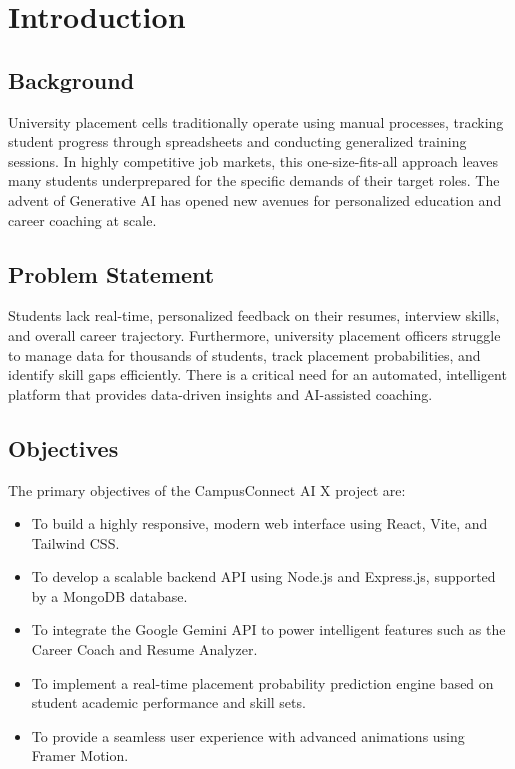 \documentclass[12pt,a4paper]{report}
\begin{document}
\tableofcontents
\newpage

\setcounter{page}{1} %

\chapter{Introduction}
\section{Background}
University placement cells traditionally operate using manual processes, tracking student progress through spreadsheets and conducting generalized training sessions. In highly competitive job markets, this one-size-fits-all approach leaves many students underprepared for the specific demands of their target roles. The advent of Generative AI has opened new avenues for personalized education and career coaching at scale.

\section{Problem Statement}
Students lack real-time, personalized feedback on their resumes, interview skills, and overall career trajectory. Furthermore, university placement officers struggle to manage data for thousands of students, track placement probabilities, and identify skill gaps efficiently. There is a critical need for an automated, intelligent platform that provides data-driven insights and AI-assisted coaching.

\section{Objectives}
The primary objectives of the CampusConnect AI X project are:
\begin{itemize}
    \item To build a highly responsive, modern web interface using React, Vite, and Tailwind CSS.
    \item To develop a scalable backend API using Node.js and Express.js, supported by a MongoDB database.
    \item To integrate the Google Gemini API to power intelligent features such as the Career Coach and Resume Analyzer.
    \item To implement a real-time placement probability prediction engine based on student academic performance and skill sets.
    \item To provide a seamless user experience with advanced animations using Framer Motion.
\end{itemize}
\end{document}
